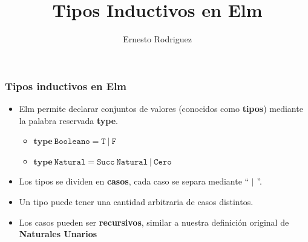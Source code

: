 \documentclass{beamer}
\title[Tipos]{Tipos Inductivos en Elm}
\author{Ernesto Rodriguez}
\institute{
    Universidad del Itsmo \\
    \medskip \textit{erodriguez@unis.edu.gt}
}
\date[\today]{}
\begin{document}
\begin{frame}
    \maketitle
\end{frame}

\begin{frame}
\frametitle{Tipos inductivos en Elm}
\begin{itemize}
    \item{Elm permite declarar conjuntos de valores (conocidos
    como {\bf tipos}) mediante la palabra reservada {\bf type}.
    \begin{itemize}
        \item{$\mathbf{type}\ \mathtt{Booleano=T\ |\ F}$}
        \item{$\mathbf{type}\ \mathtt{Natural=Succ\ Natural\ |\ Cero}$}
    \end{itemize}
    }
    \item{Los tipos se dividen en {\bf casos}, cada caso se separa
    mediante `` $\vert$ ''.}
    \item{Un tipo puede tener una cantidad arbitraria de casos distintos.}
    \item{Los casos pueden ser {\bf recursivos}, similar a nuestra definici\'on
    original de {\bf Naturales Unarios}}
\end{itemize}
\end{frame}
\end{document}
